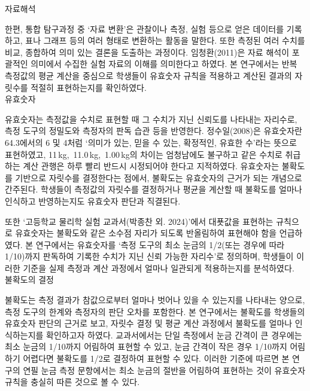 \ganada 자료해석

한편, 통합 탐구과정 중 `자료 변환'은 관찰이나 측정, 실험 등으로 얻은 데이터를 기록하고,
표나 그래프 등의 여러 형태로 변환하는 활동을 말한다.
또한 측정된 여러 수치를 비교, 종합하여 의미 있는 결론을 도출하는 과정이다.
%
임청환(2011)은 자료 해석이 포괄적인 의미에서 수집한 실험 자료의 이해를 의미한다고 하였다.
본 연구에서는 반복 측정값의 평균 계산을 중심으로 학생들이 유효숫자 규칙을 적용하고
계산된 결과의 자릿수를 적절히 표현하는지를 확인하였다. \\

\ganada 유효숫자

유효숫자는 측정값을 수치로 표현할 때 그 수치가 지닌 신뢰도를 나타내는 자리수로,
측정 도구의 정밀도와 측정자의 판독 습관 등을 반영한다.
%
정수일(2008)은 유효숫자란 64.3에서의 6 및 4처럼 `의미가 있는, 믿을 수 있는, 확정적인, 유효한 수'라는
뜻으로 표현하였고, 11\,kg,\, 11.0\,kg,\, 1.00\,kg의 차이는 엄청남에도 불구하고
같은 수치로 취급하는 계산 관행은 하루 빨리 반드시 시정되어야 한다고 지적하였다.
%
유효숫자는 불확도를 기반으로 자릿수를 결정한다는 점에서,
불확도는 유효숫자의 근거가 되는 개념으로 간주된다.
%
학생들이 측정값의 자릿수를 결정하거나 평균을 계산할 때
불확도를 얼마나 인식하고 반영하는지도 유효숫자 판단과 직결된다.

또한 `고등학교 물리학 실험 교과서(박종찬 외. 2024)'에서
대푯값을 표현하는 규칙으로 유효숫자는 불확도와 같은 소수점 자리가 되도록
반올림하여 표현해야 함을 언급하였다.
%
본 연구에서는 유효숫자를
`측정 도구의 최소 눈금의 1/2(또는 경우에 따라 1/10)까지 판독하여
기록한 수치가 지닌 신뢰 가능한 자리수'로 정의하며,
학생들이 이러한 기준을 실제 측정과 계산 과정에서 얼마나 일관되게 적용하는지를 분석하였다. \\

\ganada 불확도의 결정

불확도는 측정 결과가 참값으로부터 얼마나 벗어나 있을 수 있는지를 나타내는 양으로,
측정 도구의 한계와 측정자의 판단 오차를 포함한다.
%
본 연구에서는 불확도를 학생들의 유효숫자 판단의 근거로 보고,
자릿수 결정 및 평균 계산 과정에서 불확도를 얼마나 인식하는지를 확인하고자 하였다.
%
교과서에서는 단일 측정에서 눈금 간격이 큰 경우에는 최소 눈금의 1/10까지 어림하여 표현할 수 있고,
눈금 간격이 작은 경우 1/10까지 어림하기 어렵다면 불확도를 1/2로 결정하여 표현할 수 있다.
이러한 기준에 따르면 본 연구의 연필 눈금 측정 문항에서는
최소 눈금의 절반을 어림하여 표현하는 것이 유효숫자 규칙을 충실히 따른 것으로 볼 수 있다. \\

